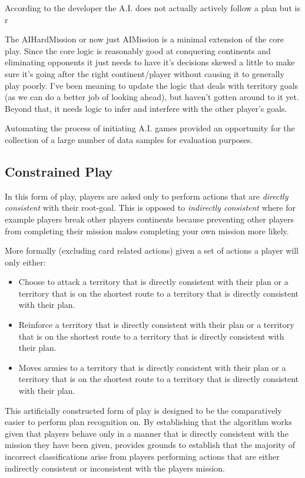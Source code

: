 \documentclass[parskip]{cs4rep}
\begin{document}
According to the developer the A.I. does not actually actively follow a plan but is r

The AIHardMission or now just AIMission is a minimal extension of the core play.  Since the core logic is reasonably good at conquering continents and eliminating opponents it just needs to have it's decisions skewed a little to make sure it's going after the right continent/player without causing it to generally play poorly.  I've been meaning to update the logic that deals with territory goals (as we can do a better job of looking ahead), but haven't gotten around to it yet.  Beyond that, it needs logic to infer and interfere with the other player's goals.

Automating the process of initiating A.I. games provided an opportunity for the collection of a large number of data samples for evaluation purposes. 

\subsection{Constrained Play}

In this form of play, players are asked only to perform actions that are \textit{directly consistent} with their root-goal. This is opposed to \textit{indirectly consistent} where for example players break other players continents because preventing other players from completing their mission makes completing your own mission more likely.

More formally (excluding card related actions) given a set of actions a player will only either:

\begin{itemize}
\item
Choose to attack a territory that is directly consistent with their plan or a territory that is on the shortest route to a territory that is directly consistent with their plan.
\item
Reinforce a territory that is directly consistent with their plan or a territory that is on the shortest route to a territory that is directly consistent with their plan.
\item
Moves armies to a territory that is directly consistent with their plan or a territory that is on the shortest route to a territory that is directly consistent with their plan.
\end{itemize}

This artificially constructed form of play is designed to be the comparatively easier to perform plan recognition on. By establishing that the algorithm works given that players behave only in a manner that is directly consistent with the mission they have been given, provides grounds to establish that the majority of incorrect classifications arise from players performing actions that are either indirectly consistent or inconsistent with the players mission.
\end{document}
